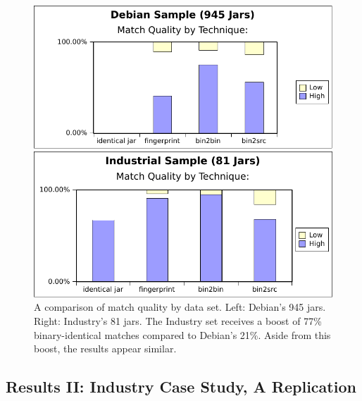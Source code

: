 \begin{figure}[ht]
\begin{minipage}[b]{0.5\linewidth}
\centering
\includegraphics[width=\columnwidth]{plots/debianMatchQuality.pdf}
\end{minipage}
\hspace{0.5cm}
\begin{minipage}[b]{0.5\linewidth}
\centering
\includegraphics[width=\columnwidth]{plots/industryMatchQuality.pdf}
\end{minipage}
\vspace{-2mm}
\caption{A comparison of match quality by data set.  Left: Debian's 945
    jars.  Right: Industry's 81 jars.  The Industry set receives a boost of
    77\% binary-identical matches compared to Debian's 21\%.  Aside from
    this boost, the results appear similar.}
\label{fig:matchQuality}
\end{figure}


\subsection{Results II:  Industry Case Study, A Replication}


